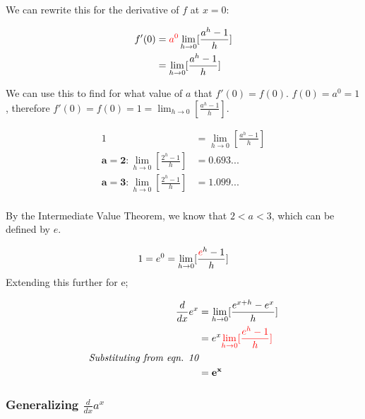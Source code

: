 \documentclass[12pt]{article}
\begin{document}
We can rewrite this for the derivative of $f$ at $x = 0$:

\begin{equation}
    \begin{split}
    f'(0) &= \textcolor{red}{a^0}\lim_{h\to 0}[\frac{a^h-1}{h}]\\
    &=\lim_{h\to 0}[\frac{a^h-1}{h}]
    \end{split}
\end{equation}

We can use this to find for what value of $a$ that $f'(0) = f(0)$. $f(0) = a^0 = 1$, therefore $f'(0) = f(0) = 1 = \lim_{h\to 0}[\frac{a^h-1}{h}]$.

\begin{equation}
    \begin{split}
        1 &= \lim_{h\to 0}[\frac{a^h-1}{h}]\\
        \mathbf{a = 2:} \lim_{h\to 0}[\frac{2^h-1}{h}] &= 0.693...\\
        \mathbf{a = 3:} \lim_{h\to 0}[\frac{2^h-1}{h}] &= 1.099...\\
    \end{split}
\end{equation}

By the Intermediate Value Theorem, we know that $2 < a < 3$, which can be defined by $e$.

\begin{equation}
    \begin{split}
        1 = e^0 = \lim_{h\to 0}[\frac{\textcolor{red}{e}^h-1}{h}]
    \end{split}
\end{equation}
Extending this further for e;

\begin{equation}
    \begin{split}
        \frac{d}{dx} e^x &= \lim_{h\to 0}[\frac{e^{x+h}-e^x}{h}]\\
        &= e^x \textcolor{red}{\lim_{h\to 0}[\frac{e^h-1}{h}]}\\
        \textit{Substituting from eqn. 10}\\
        &= \mathbf{e^x}
    \end{split}
\end{equation}

\subsubsection{Generalizing \texorpdfstring{$\frac{d}{dx} a^x$}{TEXT}}
\end{document}
